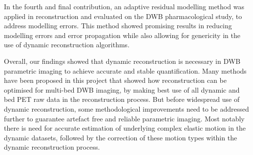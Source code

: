In the fourth and final contribution, an adaptive residual modelling method was applied in reconstruction and evaluated on the DWB pharmacological study, to address modelling errors. This method showed promising results in reducing modelling errors and error propagation while also allowing for genericity in the use of dynamic reconstruction algorithms.

Overall, our findings showed that dynamic reconstruction is necessary in DWB parametric imaging to achieve accurate and stable quantification. Many methods have been proposed in this project that showed how reconstruction can be optimised for multi-bed DWB imaging, by making best use of all dynamic and bed PET raw data in the reconstruction process. But before widespread use of dynamic reconstruction, some methodological improvements need to be addressed further to guarantee artefact free and reliable parametric imaging. Most notably there is need for accurate estimation of underlying complex elastic motion in the dynamic datasets, followed by the correction of these motion types within the dynamic reconstruction process.

